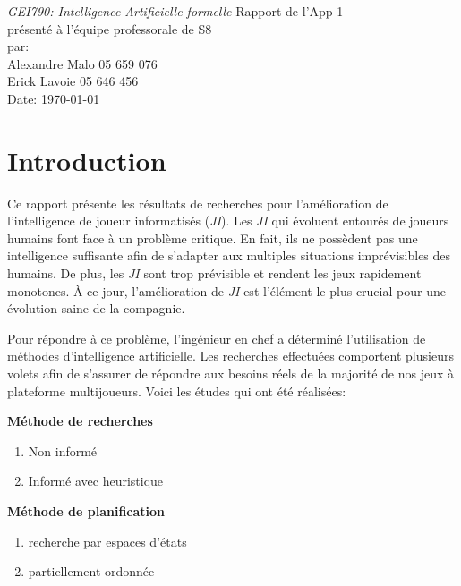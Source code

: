 \documentclass[12pt,english,frenchb,letterpaper]{article}
\begin{document}
\thispagestyle{empty}
\begin{center}
{\large\em GEI790:  Intelligence Artificielle formelle}
\vfill
Rapport de l'App 1\\
présenté à l'équipe professorale de S8\\
\vfill
par:\\
Alexandre Malo\hspace{2cm} 05 659 076\\
Erick Lavoie\hspace{2cm} 05 646 456\\
\vfill
Date: \today
\end{center}

\newpage
\onehalfspacing


\tableofcontents

\newpage


\section{Introduction}
Ce rapport présente les résultats de recherches pour l'amélioration de l'intelligence de joueur informatisés (\textit{JI}).
Les \textit{JI} qui évoluent entourés de joueurs humains font face à un problème critique. En fait, ils ne possèdent pas une intelligence suffisante afin de s'adapter aux multiples situations imprévisibles des humains. De plus, les \textit{JI} sont trop prévisible et rendent les jeux rapidement monotones. À ce jour, l'amélioration de \textit{JI} est l'élément le plus crucial pour une évolution saine de la compagnie.

Pour répondre à ce problème, l'ingénieur en chef a déterminé l'utilisation de méthodes d'intelligence artificielle. Les recherches effectuées comportent plusieurs volets afin de s'assurer de répondre aux besoins réels de la majorité de nos jeux à plateforme multijoueurs. Voici les études qui ont été réalisées:

\textbf{Méthode de recherches}
\begin{enumerate}
 \item Non informé
 \item Informé avec heuristique
\end{enumerate}

\textbf{Méthode de planification}
\begin{enumerate}
 \item recherche par espaces d'états
 \item partiellement ordonnée
\end{enumerate}
\end{document}
